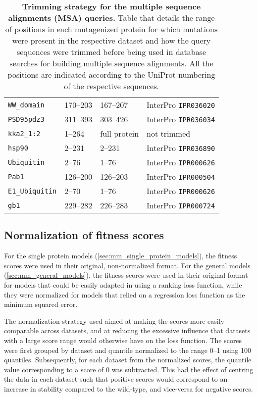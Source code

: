 \begin{table}[p]
{\begin{tabular*}{\linewidth}{@{\extracolsep{\fill}}llll}
			\texttt{WW\_domain}     & \numrange{170}{203} & \numrange{167}{207} & InterPro \texttt{IPR036020} \\
			\texttt{PSD95pdz3}      & \numrange{311}{393} & \numrange{303}{426} & InterPro \texttt{IPR036034} \\
			\texttt{kka2\_1:2}      & \numrange{1}{264}   & full protein        & not trimmed                 \\
			\texttt{hsp90}          & \numrange{2}{231}   & \numrange{2}{231}   & InterPro \texttt{IPR036890} \\
			\texttt{Ubiquitin}      & \numrange{2}{76}    & \numrange{1}{76}    & InterPro \texttt{IPR000626} \\
			\texttt{Pab1}           & \numrange{126}{200} & \numrange{126}{203} & InterPro \texttt{IPR000504} \\
			\texttt{E1\_Ubiquitin}  & \numrange{2}{70}    & \numrange{1}{76}    & InterPro \texttt{IPR000626} \\
			\texttt{gb1}            & \numrange{229}{282} & \numrange{226}{283} & InterPro \texttt{IPR000724} \\
			\bottomrule
		\end{tabular*}%
	}%
	{\caption[Trimming strategy for the multiple sequence alignments queries]{%
			\textbf{Trimming strategy for the multiple sequence alignments (MSA) queries.}
			Table that details the range of positions in each mutagenized protein for which mutations were present in the respective dataset and how the query sequences were trimmed before being used in database searches for building multiple sequence alignments.
			All the positions are indicated according to the UniProt numbering of the respective sequences.
		}\label{tab:mut_range}%
	}%
\end{table}

\subsection{Normalization of fitness scores}\label{sec:mm_quantile_norm}
For the single protein models (\cref{sec:mm_single_protein_models}), the fitness scores were used in their original, non-normalized format.
For the general models (\cref{sec:mm_general_models}), the fitness scores were used in their original format for models that could be easily adapted in using a ranking loss function, while they were normalized for models that relied on a regression loss function as the minimum squared error.

The normalization strategy used aimed at making the scores more easily comparable across datasets, and at reducing the excessive influence that datasets with a large score range would otherwise have on the loss function.
The scores were first grouped by dataset and quantile normalized to the range \numrange{0}{1} using \num{100} quantiles.
Subsequently, for each dataset from the normalized scores, the quantile value corresponding to a score of \num{0} was subtracted.
This had the effect of centring the data in each dataset such that positive scores would correspond to an increase in stability compared to the wild-type, and vice-versa for negative scores.

